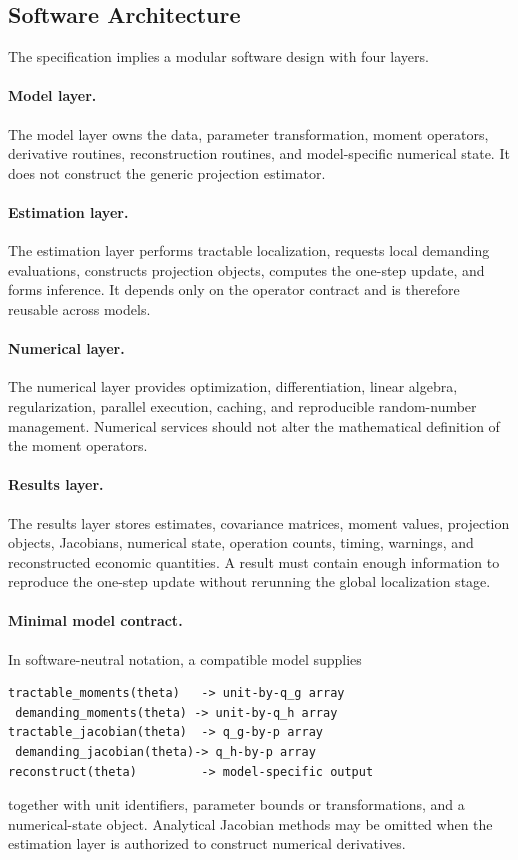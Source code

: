 \subsection{Software Architecture}
\label{app:software_architecture}

The specification implies a modular software design with four layers.

\paragraph{Model layer.}
The model layer owns the data, parameter transformation, moment operators,
derivative routines, reconstruction routines, and model-specific numerical
state. It does not construct the generic projection estimator.

\paragraph{Estimation layer.}
The estimation layer performs tractable localization, requests local demanding
evaluations, constructs projection objects, computes the one-step update, and
forms inference. It depends only on the operator contract and is therefore
reusable across models.

\paragraph{Numerical layer.}
The numerical layer provides optimization, differentiation, linear algebra,
regularization, parallel execution, caching, and reproducible random-number
management. Numerical services should not alter the mathematical definition of
the moment operators.

\paragraph{Results layer.}
The results layer stores estimates, covariance matrices, moment values,
projection objects, Jacobians, numerical state, operation counts, timing,
warnings, and reconstructed economic quantities. A result must contain enough
information to reproduce the one-step update without rerunning the global
localization stage.

\paragraph{Minimal model contract.}
In software-neutral notation, a compatible model supplies
\begin{verbatim}
tractable_moments(theta)   -> unit-by-q_g array
 demanding_moments(theta) -> unit-by-q_h array
tractable_jacobian(theta)  -> q_g-by-p array
 demanding_jacobian(theta)-> q_h-by-p array
reconstruct(theta)         -> model-specific output
\end{verbatim}
together with unit identifiers, parameter bounds or transformations, and a
numerical-state object. Analytical Jacobian methods may be omitted when the
estimation layer is authorized to construct numerical derivatives.


